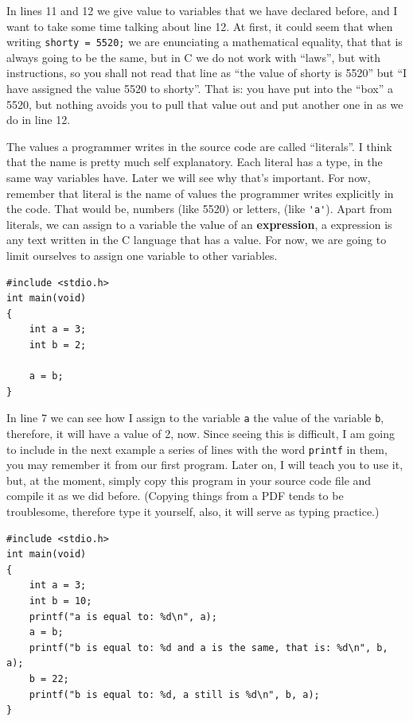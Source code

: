 \documentclass[a4paper]{article}
\begin{document}
In lines 11 and 12 we give value to variables that we have declared before,
and I want to take some time talking about line 12. At first, it could seem
that when writing \verb!shorty = 5520;! we are enunciating a mathematical
equality, that that is always going to be the same, but in C we do not work with
``laws'', but with instructions, so you shall not read that line as ``the value
of shorty is 5520'' but ``I have assigned the value 5520 to shorty''. That is:
you have put into the ``box'' a 5520, but nothing avoids you to pull that
value out and put another one in as we do in line 12.

The values a programmer writes in the source code are called ``literals''. I
think that the name is pretty much self explanatory. Each literal has a type,
in the same way variables have. Later we will see why that's important. For now,
remember that literal is the name of values the programmer writes
explicitly in the code. That would be, numbers (like 5520) or letters,
(like \verb!'a'!). Apart from literals, we can assign to a variable the
value of an \textbf{expression}, a expression is any text written in the C
language that has a value. For now, we are going to limit ourselves to assign
one variable to other variables.

\noindent
\begin{minipage}[H]{\linewidth}
\mbox{}
\begin{lstlisting}[style=C, caption={Assigning variables to other variables},
label={lst:variableAsignationBetween}]
#include <stdio.h>
int main(void)
{
    int a = 3;
    int b = 2;

    a = b;
}
\end{lstlisting}
\end{minipage}

In line 7 we can see how I assign to the variable \verb"a" the value of the
variable \verb!b!, therefore, it will have a value of 2, now. Since seeing this
is difficult, I am going to include in the next example a series of lines with
the word \verb!printf! in them, you may remember it from our first program.
Later on, I will teach you to use it, but, at the moment, simply copy this
program in your source code file and compile it as we did before. (Copying
things from a PDF tends to be troublesome, therefore type it yourself, also, it
will serve as typing practice.)

\noindent
\begin{minipage}[H]{\linewidth}
\mbox{}
\begin{lstlisting}[style=C, caption={Final example of variable using},
label={lst:variableFinalExample}]
#include <stdio.h>
int main(void)
{
    int a = 3;
    int b = 10;
    printf("a is equal to: %d\n", a);
    a = b;
    printf("b is equal to: %d and a is the same, that is: %d\n", b, a);
    b = 22;
    printf("b is equal to: %d, a still is %d\n", b, a);
}
\end{lstlisting}
\end{minipage}
\end{document}

